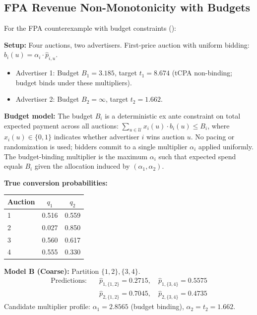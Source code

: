 \documentclass{article}
\theoremstyle{plain}
\theoremstyle{definition}
\theoremstyle{remark}
\newcommand{\cU}{\mathcal{U}}
\begin{document}
\subsection{FPA Revenue Non-Monotonicity with Budgets}
\label{app:counter-fpa-budget}

For the FPA counterexample with budget constraints ():

\textbf{Setup:} Four auctions, two advertisers. First-price auction with uniform bidding: $b_i(u) = \alpha_i \cdot \hat{p}_{i,u}$.
\begin{itemize}
    \item Advertiser 1: Budget $B_1 = 3.185$, target $t_1 = 8.674$ (tCPA non-binding; budget binds under these multipliers).
    \item Advertiser 2: Budget $B_2 = \infty$, target $t_2 = 1.662$.
\end{itemize}

\textbf{Budget model:} The budget $B_i$ is a deterministic ex ante constraint on total expected payment across all auctions: $\sum_{u \in \cU} x_i(u) \cdot b_i(u) \leq B_i$, where $x_i(u) \in \{0,1\}$ indicates whether advertiser $i$ wins auction $u$. No pacing or randomization is used; bidders commit to a single multiplier $\alpha_i$ applied uniformly. The budget-binding multiplier is the maximum $\alpha_i$ such that expected spend equals $B_i$ given the allocation induced by $(\alpha_1, \alpha_2)$.

\textbf{True conversion probabilities:}
\begin{center}
\begin{tabular}{lcc}
\toprule
Auction & $q_1$ & $q_2$ \\
\midrule
1 & 0.516 & 0.559 \\
2 & 0.027 & 0.850 \\
3 & 0.560 & 0.617 \\
4 & 0.555 & 0.330 \\
\bottomrule
\end{tabular}
\end{center}

\textbf{Model B (Coarse):} Partition $\{1,2\}, \{3,4\}$.
\begin{align}
\text{Predictions:} \quad & \hat{p}_{1,\{1,2\}} = 0.2715, \quad \hat{p}_{1,\{3,4\}} = 0.5575 \\
& \hat{p}_{2,\{1,2\}} = 0.7045, \quad \hat{p}_{2,\{3,4\}} = 0.4735
\end{align}
Candidate multiplier profile: $\alpha_1 = 2.8565$ (budget binding), $\alpha_2 = t_2 = 1.662$.
\end{document}
